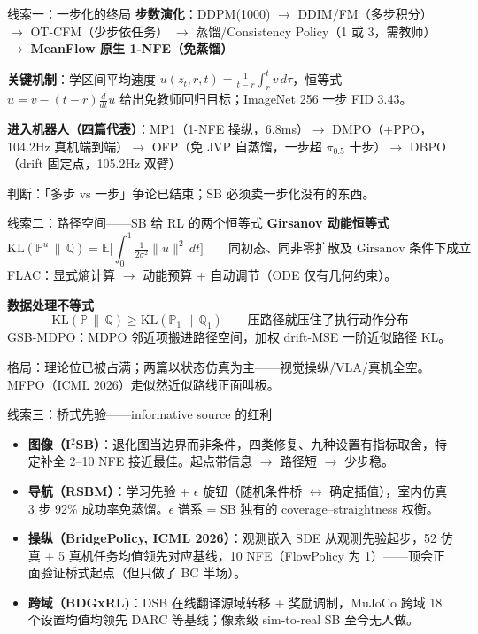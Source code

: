 \documentclass[10pt,aspectratio=169,fontset=none]{ctexbeamer}
\begin{document}
\begin{frame}{线索一：一步化的终局}
\textbf{步数演化}：DDPM(1000) $\to$ DDIM/FM（多步积分） $\to$ OT-CFM（少步依任务） $\to$ 蒸馏/Consistency Policy（1 或 3，需教师） $\to$ \textbf{MeanFlow 原生 1-NFE（免蒸馏）}
\vspace{4pt}

\textbf{关键机制}：学区间平均速度 $u(z_t,r,t)=\frac{1}{t-r}\int_r^t v\,d\tau$，恒等式
$u = v-(t-r)\tfrac{d}{dt}u$ 给出免教师回归目标；ImageNet 256 一步 FID 3.43。
\vspace{4pt}

\textbf{进入机器人（四篇代表）}：MP1（1-NFE 操纵，6.8ms）$\to$ DMPO（+PPO，104.2Hz 真机端到端）$\to$ OFP（免 JVP 自蒸馏，一步超 $\pi_{0.5}$ 十步）$\to$ DBPO（drift 固定点，105.2Hz 双臂）
\vspace{4pt}

\alert{判断：「多步 vs 一步」争论已结束；SB 必须卖一步化没有的东西。}
\end{frame}

\begin{frame}{线索二：路径空间——SB 给 RL 的两个恒等式}
\textbf{Girsanov 动能恒等式}
\[
\mathrm{KL}(\mathbb{P}^u\,\|\,\mathbb{Q}) = \mathbb{E}\Big[\int_0^1 \tfrac{1}{2\sigma^2}\|u\|^2\,dt\Big]
\qquad\text{同初态、同非零扩散及 Girsanov 条件下成立}
\]
FLAC：显式熵计算 $\to$ 动能预算 + 自动调节（ODE 仅有几何约束）。
\vspace{4pt}

\textbf{数据处理不等式}
\[
\mathrm{KL}(\mathbb{P}\,\|\,\mathbb{Q}) \ge \mathrm{KL}(\mathbb{P}_1\,\|\,\mathbb{Q}_1)
\qquad\text{压路径就压住了执行动作分布}
\]
GSB-MDPO：MDPO 邻近项搬进路径空间，加权 drift-MSE 一阶近似路径 KL。
\vspace{4pt}

\alert{格局：理论位已被占满；两篇以状态仿真为主——视觉操纵/VLA/真机全空。MFPO（ICML 2026）走似然近似路线正面叫板。}
\end{frame}

\begin{frame}{线索三：桥式先验——informative source 的红利}
\begin{itemize}
  \item \textbf{图像（I$^2$SB）}：退化图当边界而非条件，四类修复、九种设置有指标取舍，特定补全 2--10 NFE 接近最佳。起点带信息 $\to$ 路径短 $\to$ 少步稳。
  \item \textbf{导航（RSBM）}：学习先验 + $\epsilon$ 旋钮（随机条件桥 $\leftrightarrow$ 确定插值），室内仿真 3 步 92\% 成功率免蒸馏。$\epsilon$ 谱系 = SB 独有的 coverage--straightness 权衡。
  \item \textbf{操纵（BridgePolicy, ICML 2026）}：观测嵌入 SDE 从观测先验起步，52 仿真 + 5 真机任务均值领先对应基线，10 NFE（FlowPolicy 为 1）——顶会正面验证桥式起点（但只做了 BC 半场）。
  \item \textbf{跨域（BDGxRL)}：DSB 在线翻译源域转移 + 奖励调制，MuJoCo 跨域 18 个设置均值均领先 DARC 等基线；像素级 sim-to-real SB 至今无人做。
\end{itemize}
\end{frame}
\end{document}
